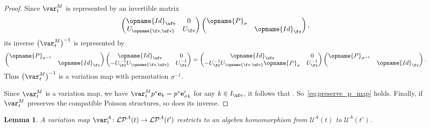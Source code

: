 \documentclass[pdftex]{sigma}
\newcommand{\Iufv}{I_{\ufv}}
\newcommand{\upClAlg}{\mathcal{U}^A}
\newcommand{\LP}{{\mathcal{LP}}}
\newcommand{\Id}{{\opname{Id}}}
\newcommand{\trans}{\opname{P}}
\newcommand{\ee}{\mathbf{e}}
\newcommand{\low}{\opname{\fv,\ufv}}
\numberwithin{equation}{section}
\newtheorem{Lemma}[Theorem]{Lemma}
\begin{document}
\begin{proof}

Since $\var_{t}^{M}$ is represented by an invertible matrix
\[
\begin{pmatrix}
\Id_{\ufv} & 0\\
U_{\low} & U_{\fv}
\end{pmatrix}\begin{pmatrix}
\trans_{\sigma}\\
 & \Id_{\fv}
\end{pmatrix},\]
its inverse $\bigl(\var_{t}^{M}\bigr)^{-1}$ is represented by
\[\begin{pmatrix}
\trans_{\sigma^{-1}}\\
 & \Id_{\fv}
\end{pmatrix}\begin{pmatrix}
\Id_{\ufv} & 0\\
-U_{\fv}^{-1}U_{\low} & U_{\fv}^{-1}
\end{pmatrix}=
\begin{pmatrix}
\Id_{\ufv} & 0\\
-U_{\fv}^{-1}U_{\low}\trans_{\sigma} & U_{\fv}^{-1}
\end{pmatrix}\begin{pmatrix}
\trans_{\sigma^{-1}}\\
 & \Id_{\fv}
\end{pmatrix}.
\]
Thus $\bigl(\var_{t}^{M}\bigr)^{-1}$ is a variation map with permutation ${\sigma}^{-1}$.

Since $\var_{t}^{M}$ is a variation map, we have $\var_{t}^{M}p^{*}\ee_{k}=p^{*}\ee_{\sigma k}'$
for any $k\in\Iufv$, it follows that \smash{$\bigl(\var_{t}^{M}\bigr)^{-1}p^{*}\ee_{k}'=p^{*}\ee_{{\sigma}^{-1}k}$}.
So~\eqref{eq:preserve_p_map} holds. Finally, if $\var_{t}^{M}$ preserves
the compatible Poisson structures, so does its inverse.
\end{proof}


\begin{Lemma}\label{lem:A_variation_restrict_cluster_alg}
 A variation map $\var_{t}^{A}\colon\LP^A(t)\rightarrow\LP^A(t')$ restricts to an algebra homomorphism from $\upClAlg(t)$
 to $\upClAlg(t')$.
 \end{Lemma}
\end{document}
